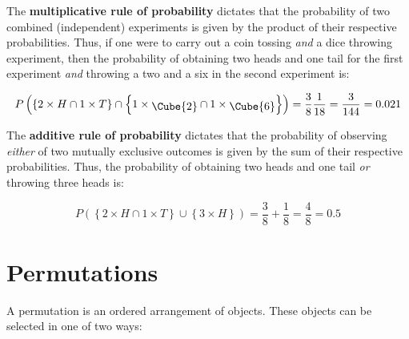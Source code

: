 The \textbf{multiplicative rule of
  probability}\label{page:multiplication} dictates that the
probability of two combined (independent) experiments is given by the
product of their respective probabilities. Thus, if one were to carry
out a coin tossing \emph{and} a dice throwing experiment, then the
probability of obtaining two heads and one tail for the first
experiment \emph{and} throwing a two and a six in the second
experiment is:

\[
P\left(\left\{2\times{H} \cap 1\times{T}\right\} \cap
\left\{1\times\mbox{\raisebox{-2pt}{\Cube{2}}} \cap
1\times\mbox{\raisebox{-2pt}{\Cube{6}}}\right\}\right) =
\frac{3}{8}\frac{1}{18} = \frac{3}{144} = 0.021
\]

The \textbf{additive rule of probability}\label{page:addition}
dictates that the probability of observing \emph{either} of two
mutually exclusive outcomes is given by the sum of their respective
probabilities. Thus, the probability of obtaining two heads and one
tail \emph{or} throwing three heads is:

\[
P\left(\left\{2\times{H} \cap 1\times{T}\right\} \cup
\left\{3\times{H}\right\}\right) = \frac{3}{8} + \frac{1}{8} = \frac{4}{8} = 0.5
\]

\section{Permutations}
\label{sec:permutations}

A permutation is an ordered arrangement of objects. These objects can
be selected in one of two ways:

